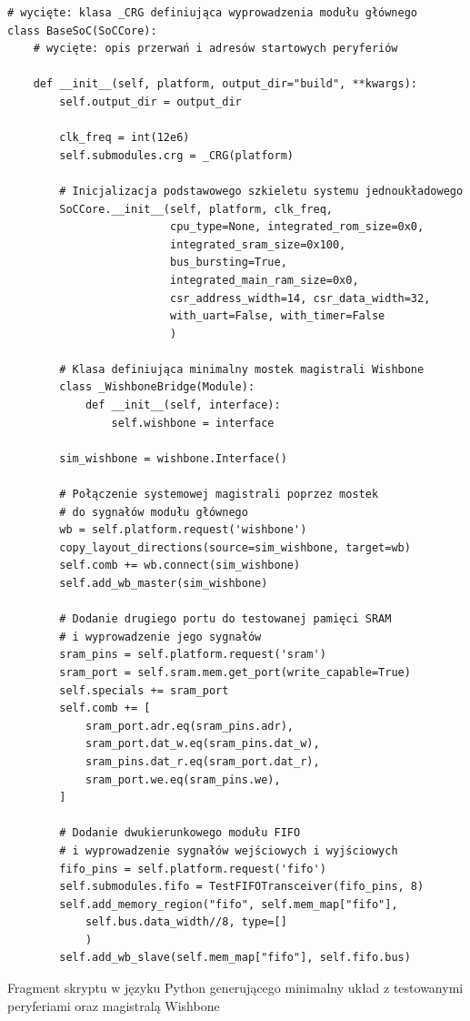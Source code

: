 \begin{longlisting}
\begin{verbatim}
# wycięte: klasa _CRG definiująca wyprowadzenia modułu głównego
class BaseSoC(SoCCore):
    # wycięte: opis przerwań i adresów startowych peryferiów

    def __init__(self, platform, output_dir="build", **kwargs):
        self.output_dir = output_dir

        clk_freq = int(12e6)
        self.submodules.crg = _CRG(platform)

        # Inicjalizacja podstawowego szkieletu systemu jednoukładowego
        SoCCore.__init__(self, platform, clk_freq,
                         cpu_type=None, integrated_rom_size=0x0,
                         integrated_sram_size=0x100,
                         bus_bursting=True,
                         integrated_main_ram_size=0x0,
                         csr_address_width=14, csr_data_width=32,
                         with_uart=False, with_timer=False
                         )

        # Klasa definiująca minimalny mostek magistrali Wishbone
        class _WishboneBridge(Module):
            def __init__(self, interface):
                self.wishbone = interface

        sim_wishbone = wishbone.Interface()

        # Połączenie systemowej magistrali poprzez mostek
        # do sygnałów modułu głównego
        wb = self.platform.request('wishbone')
        copy_layout_directions(source=sim_wishbone, target=wb)
        self.comb += wb.connect(sim_wishbone)
        self.add_wb_master(sim_wishbone)

        # Dodanie drugiego portu do testowanej pamięci SRAM
        # i wyprowadzenie jego sygnałów
        sram_pins = self.platform.request('sram')
        sram_port = self.sram.mem.get_port(write_capable=True)
        self.specials += sram_port
        self.comb += [
            sram_port.adr.eq(sram_pins.adr),
            sram_port.dat_w.eq(sram_pins.dat_w),
            sram_pins.dat_r.eq(sram_port.dat_r),
            sram_port.we.eq(sram_pins.we),
        ]

        # Dodanie dwukierunkowego modułu FIFO
        # i wyprowadzenie sygnałów wejściowych i wyjściowych
        fifo_pins = self.platform.request('fifo')
        self.submodules.fifo = TestFIFOTransceiver(fifo_pins, 8)
        self.add_memory_region("fifo", self.mem_map["fifo"],
            self.bus.data_width//8, type=[]
            )
        self.add_wb_slave(self.mem_map["fifo"], self.fifo.bus)
\end{verbatim}
\caption{\label{lst:harness-basesoc}Fragment skryptu w języku Python generującego minimalny układ z testowanymi peryferiami oraz magistralą Wishbone}
\end{longlisting}

